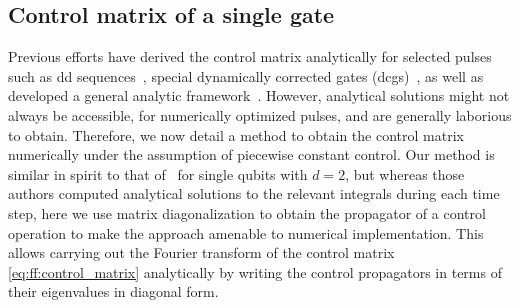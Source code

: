 \subsection{Control matrix of a single gate}\label{subsec:ff:theory:control_matrix:pulse}
Previous efforts have derived the control matrix analytically for selected pulses such as \gls{dd} sequences~\cite{Cywinski2008}, special dynamically corrected gates (\glspl{dcg})~\cite{Gungordu2018}, as well as developed a general analytic framework~\cite{Green2012,Green2013}.
However, analytical solutions might not always be accessible, \eg for numerically optimized pulses, and are generally laborious to obtain.
Therefore, we now detail a method to obtain the control matrix numerically under the assumption of piecewise constant control.
Our method is similar in spirit to that of~\citet{Green2012} for single qubits with $d=2$, but whereas those authors computed analytical solutions to the relevant integrals during each time step, here we use matrix diagonalization to obtain the propagator of a control operation to make the approach amenable to numerical implementation.
This allows carrying out the Fourier transform of the control matrix \cref{eq:ff:control_matrix} analytically by writing the control propagators in terms of their eigenvalues in diagonal form.

